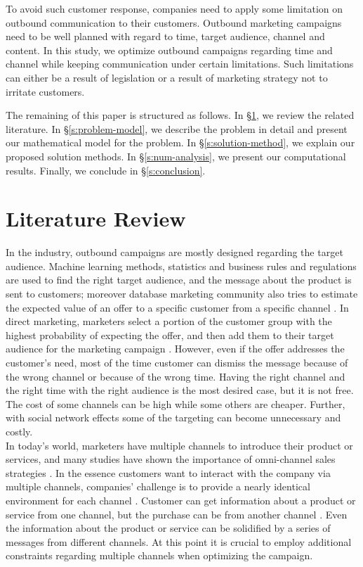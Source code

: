 \documentclass[11pt]{article}
\begin{document}
To avoid such customer response, companies need to apply some limitation on outbound communication to their customers. Outbound marketing campaigns need to be well planned with regard to time, target audience, channel and content. In this study, we optimize outbound campaigns regarding time and channel while keeping communication under certain limitations. Such limitations can either be a result of legislation or a result of marketing strategy not to irritate customers.

The remaining of this paper is structured as follows. In \S \ref{s:literature-review}, we review the related literature. In \S \ref{s:problem-model}, we describe the problem in detail and present our mathematical model for the problem. In \S \ref{s:solution-method}, we explain our proposed solution methods. In \S \ref{s:num-analysis}, we present our computational results. Finally, we conclude in \S \ref{s:conclusion}.


\section{Literature Review}  \label{s:literature-review}

In the industry, outbound campaigns are mostly designed regarding the target audience. Machine learning methods, statistics and business rules and regulations are used to find the right target audience, and the message about the product is sent to customers; moreover database marketing community also tries to estimate the expected value of an offer to a specific customer from a specific channel \citep{cohen_exp, oliveira_hypr}. In direct marketing, marketers select a portion of the customer group with the highest probability of expecting the offer, and then add them to their target audience for the marketing campaign \citep{owczarczuk}. However, even if the offer addresses the customer’s need, most of the time customer can dismiss the message because of the wrong channel or because of the wrong time. Having the right channel and the right time with the right audience is the most desired case, but it is not free. The cost of some channels can be high while some others are cheaper. Further, with social network effects some of the targeting can become unnecessary and costly.\\

In today’s world, marketers have multiple channels to introduce their product or services, and many studies have shown the importance of omni-channel sales strategies \citep{shankar, park}. In the essence customers want to interact with the company via multiple channels, companies’ challenge is to provide a nearly identical environment for each channel \citep{bell}. Customer can get information about a product or service from one channel, but the purchase can be from another channel \citep{park}. Even the information about the product or service can be solidified by a series of messages from different channels. At this point it is crucial to employ additional constraints regarding multiple channels when optimizing the campaign.\\
\end{document}
